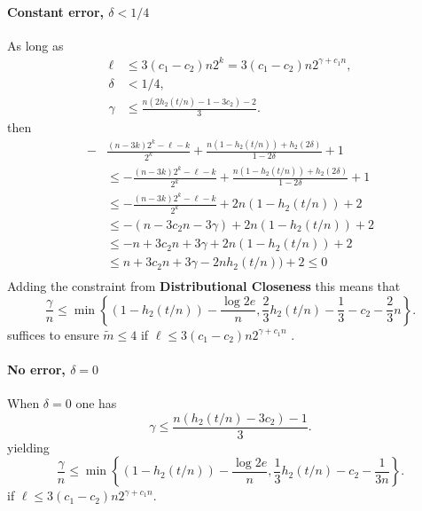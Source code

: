 \paragraph{Constant error, $\delta<1/4$} 
As long as 
\begin{align*}
\ell&\le 3(c_1-c_2) n2^k = 3(c_1-c_2)n2^{\gamma+c_1n},\\
\delta &< 1/4,\\
\gamma &\le \frac{n(2h_2(t/n)-1-3c_2 )-2}{3}.
\end{align*} then 
\begin{align*}
-&\frac{(n-3k)2^k-\ell-k}{2^k} + \frac{n(1-h_2(t/n)) +h_2(2\delta)}{1-2\delta}+1\\
&\le -\frac{(n-3k)2^k-\ell-k}{2^k} + \frac{n(1-h_2(t/n)) +h_2(2\delta)}{1-2\delta}+1 \\
&\le -\frac{(n-3k)2^k-\ell-k}{2^k} + 2n(1-h_2(t/n)) +2\\
 &\le -(n-3c_2n - 3\gamma) + 2n(1-h_2(t/n)) +2\\
&\le -n+3c_2n+3\gamma + 2n(1-h_2(t/n))+2 \\\
&\le n+3c_2n+3\gamma -2nh_2(t/n))+2 \le 0\\
\end{align*}
Adding the constraint from \textbf{Distributional Closeness}
this means that 
\[
\frac{\gamma}{n} \le \min\left\{(1-h_2(t/n)) - \frac{\log{2e}}{n}, \frac{2}{3}h_2(t/n)-\frac{1}{3}-c_2-\frac{2}{3}n\right\}.
\]
suffices to ensure $\tilde{m} \le 4$ if $\ell\le 3(c_1-c_2)n2^{\gamma+c_1n}$ .

\paragraph{No error, $\delta=0$}
When $\delta = 0$ one has
\[
\gamma \le \frac{n( h_2(t/n)-3c_2)-1}{3}.\]
yielding
\[
\frac{\gamma}{n} \le \min\left\{(1-h_2(t/n)) - \frac{\log{2e}}{n}, \frac{1}{3}h_2(t/n)-c_2-\frac{1}{3n}\right\}.
\]
if $\ell\le 3(c_1-c_2)n2^{\gamma+c_1n}$.


